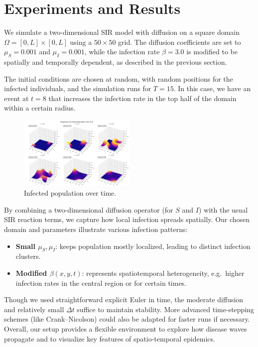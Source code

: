 \section{Experiments and Results}

We simulate a two-dimensional SIR model with diffusion on a square domain \(\Omega = [0,L]\times [0,L]\) using a \(50\times 50\) grid.
The diffusion coefficients are set to \(\mu_S = 0.001\) and \(\mu_I = 0.001\), while the infection rate \(\beta=3.0\) is modified to be spatially and temporally dependent, as described in the previous section.

The initial conditions are chosen at random, with random positions for the infected individuals, and the simulation runs for \(T=15\).
In this case, we have an event at \(t=8\) that increases the infection rate in the top half of the domain within a certain radius.

\begin{figure}[H]
  \centering
  \includegraphics[width=0.5\textwidth]{figures/infected_progression.png}
  \caption{Infected population over time.}
  \label{fig:infected_progression}
\end{figure}

By combining a two-dimensional diffusion operator (for $S$ and $I$) with the usual SIR reaction terms, we capture how local infection spreads spatially. Our chosen domain and parameters illustrate various infection patterns:
\begin{itemize}
  \item \textbf{Small \(\mu_S,\mu_I\)}: keeps population mostly localized, leading to distinct infection clusters.
  \item \textbf{Modified \(\beta(x,y,t)\)}: represents spatiotemporal heterogeneity, e.g.\ higher infection rates in the central region or for certain times.
\end{itemize}
Though we used straightforward explicit Euler in time, the moderate diffusion and relatively small \(\Delta t\) suffice to maintain stability. More advanced time-stepping schemes (like Crank--Nicolson) could also be adapted for faster runs if necessary. Overall, our setup provides a flexible environment to explore how disease waves propagate and to visualize key features of spatio-temporal epidemics.